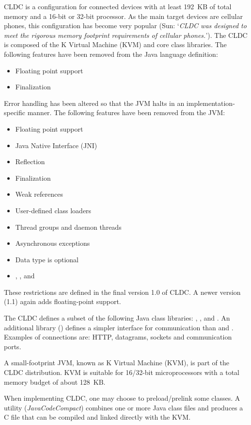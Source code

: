 CLDC is a configuration for connected devices with at least 192~KB
of total memory and a 16-bit or 32-bit processor. As the main target
devices are cellular phones, this configuration has become very
popular (Sun: `\textit{CLDC was designed to meet the rigorous memory
footprint requirements of cellular phones.}'). The CLDC is composed
of the K Virtual Machine (KVM) and core class libraries. The
following features have been removed from the Java language
definition:
%
\begin{itemize}
    \item Floating point support
    \item Finalization
\end{itemize}
%
Error handling has been altered so that the JVM halts in an
implementation-specific manner. The following features have been
removed from the JVM:
%
\begin{itemize}
    \item Floating point support
    \item Java Native Interface (JNI)
    \item Reflection
    \item Finalization
    \item Weak references
    \item User-defined class loaders
    \item Thread groups and daemon threads
    \item Asynchronous exceptions
    \item Data type  is optional
    \item {}, , and 
\end{itemize}
%
These restrictions are defined in the final version 1.0 of CLDC. A
newer version (1.1) again adds floating-point support.

The CLDC defines a subset of the following Java class libraries:
, ,  and
. An additional library
() defines a simpler
interface for communication than  and .
Examples of connections are: HTTP, datagrams, sockets and
communication ports.

A small-footprint JVM, known as K Virtual Machine (KVM), is part of
the CLDC distribution. KVM is suitable for 16/32-bit microprocessors
with a total memory budget of about 128~KB.

When implementing CLDC, one may choose to preload/prelink some
classes. A utility (\textit{JavaCodeCompact}) combines one or more
Java class files and produces a C file that can be compiled and
linked directly with the KVM.

